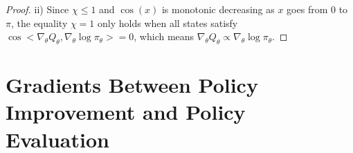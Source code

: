 {\begin{proof}
ii) Since $\chi \leq 1$ and $\cos(x)$ is monotonic decreasing as $x$ goes from $0$ to $\pi$, the equality $\chi = 1$ only holds when all states satisfy $\cos <\nabla_\theta Q_\theta, \nabla_\theta \log \pi_\theta> = 0$, which means $\nabla_\theta Q_\theta \propto \nabla_\theta \log \pi_\theta$. 
\end{proof}
}

\clearpage

\section{Gradients Between Policy Improvement and Policy Evaluation}
\label{app:mtv}


